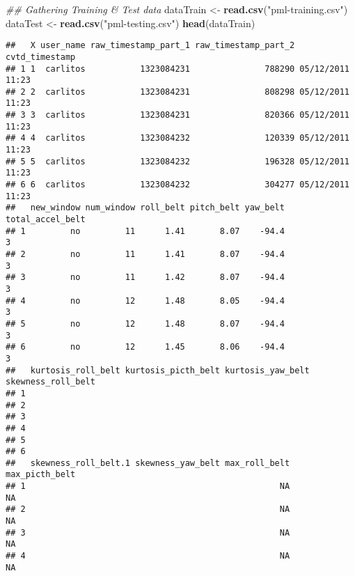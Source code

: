 \documentclass[]{article}
\newenvironment{Shaded}{\begin{snugshade}}{\end{snugshade}}
\newcommand{\CommentTok}[1]{\textcolor[rgb]{0.56,0.35,0.01}{\textit{#1}}}
\newcommand{\KeywordTok}[1]{\textcolor[rgb]{0.13,0.29,0.53}{\textbf{#1}}}
\newcommand{\NormalTok}[1]{#1}
\newcommand{\StringTok}[1]{\textcolor[rgb]{0.31,0.60,0.02}{#1}}
\begin{document}
\begin{Shaded}
\begin{Highlighting}[]
\CommentTok{## Gathering Training & Test data}
\NormalTok{dataTrain <-}\StringTok{ }\KeywordTok{read.csv}\NormalTok{(}\StringTok{"pml-training.csv"}\NormalTok{)}
\NormalTok{dataTest <-}\StringTok{ }\KeywordTok{read.csv}\NormalTok{(}\StringTok{"pml-testing.csv"}\NormalTok{)}
\KeywordTok{head}\NormalTok{(dataTrain)}
\end{Highlighting}
\end{Shaded}

\begin{verbatim}
##   X user_name raw_timestamp_part_1 raw_timestamp_part_2   cvtd_timestamp
## 1 1  carlitos           1323084231               788290 05/12/2011 11:23
## 2 2  carlitos           1323084231               808298 05/12/2011 11:23
## 3 3  carlitos           1323084231               820366 05/12/2011 11:23
## 4 4  carlitos           1323084232               120339 05/12/2011 11:23
## 5 5  carlitos           1323084232               196328 05/12/2011 11:23
## 6 6  carlitos           1323084232               304277 05/12/2011 11:23
##   new_window num_window roll_belt pitch_belt yaw_belt total_accel_belt
## 1         no         11      1.41       8.07    -94.4                3
## 2         no         11      1.41       8.07    -94.4                3
## 3         no         11      1.42       8.07    -94.4                3
## 4         no         12      1.48       8.05    -94.4                3
## 5         no         12      1.48       8.07    -94.4                3
## 6         no         12      1.45       8.06    -94.4                3
##   kurtosis_roll_belt kurtosis_picth_belt kurtosis_yaw_belt skewness_roll_belt
## 1                                                                            
## 2                                                                            
## 3                                                                            
## 4                                                                            
## 5                                                                            
## 6                                                                            
##   skewness_roll_belt.1 skewness_yaw_belt max_roll_belt max_picth_belt
## 1                                                   NA             NA
## 2                                                   NA             NA
## 3                                                   NA             NA
## 4                                                   NA             NA

\end{verbatim}
\end{document}
